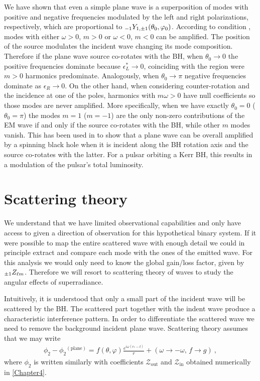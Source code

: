 We have shown that even a simple plane wave is a superposition of modes with positive and negative frequencies modulated by the left and right polarizations, respectively, which are proportional to $\uu[-1]{Y}{1, \pm 1}(\theta_0, \varphi_0)$.
According to condition , modes with either $\omega>0$, $m>0$ or $\omega<0$, $m<0$ can be amplified.
The position of the source modulates the incident wave changing its mode composition. 
Therefore if the plane wave source co-rotates with the BH, when $\theta_0 \to 0$ the positive frequencies dominate because $\epsilon_L^*\to 0$, coinciding with the region were $m>0$ harmonics predominate. Analogously, when $\theta_0\to\pi$ negative frequencies dominate as $\epsilon_R \to 0$.
On the other hand, when considering counter-rotation and the incidence at one of the poles, harmonics with $m \omega >0$ have null coefficients so those modes are never amplified.
More specifically, when we have exactly $\theta_0=0$ ($\theta_0=\pi$) the modes $m=1$ ($m=-1$) are the only non-zero contributions of the EM wave if and only if the source co-rotates with the BH, while other $m$ modes vanish.
This has been used in \cite{Rosa2017} to show that a plane wave can be overall amplified by a spinning black hole when it is incident along the BH rotation axis and the source co-rotates with the latter. For a pulsar orbiting a Kerr BH, this results in a modulation of the pulsar’s total luminosity.


\section{Scattering theory}

We understand that we have limited observational capabilities and only have access to given a direction of observation for this hypothetical binary system.
If it were possible to map the entire scattered wave with enough detail we could in principle extract and compare each mode with the ones of the emitted wave. For this analysis we would only need to know the global gain/loss factor, given by $\uu[\pm1]Z{\ell m}$. Therefore we will resort to scattering theory of waves to study the angular effects of superradiance.

Intuitively, it is understood that only a small part of the incident wave will be scattered by the BH.
The scattered part together with the indent wave produce a characteristic interference pattern.
In order to differentiate the scattered wave we need to remove the background incident plane wave.
Scattering theory assumes that we may write
\begin{align}
    \label{eq5:scattering}
    \phi_2 - \phi_2{}^{(\mathrm{plane})} = f(\theta,\varphi) \frac{e^{i \omega (r_{*}-t)}}{r} + (\omega\to-\omega, \,f \to g) ~,
\end{align}
where $\phi_2$ is written similarly with coefficients $\mathscr{Z}_\mathrm{out}$ and $\mathscr{Z}_\mathrm{in}$ obtained numerically in \cref{Chapter4}.

